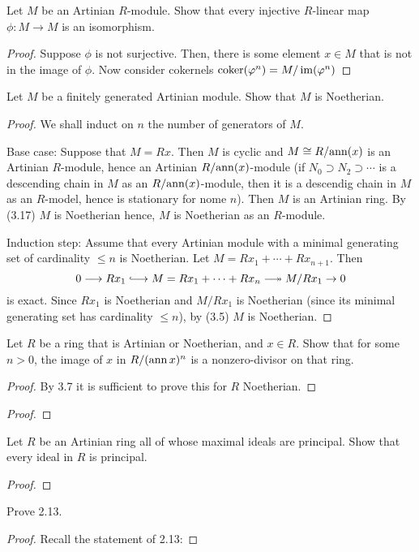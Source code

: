 \newpage
\begin{problem}
Let $M$ be an Artinian $R$-module. Show that every injective
$R$-linear map $\phi\colon M\to M$ is an isomorphism.
\end{problem}
\begin{proof}
Suppose $\phi$ is not surjective. Then, there is some element
$x\in M$ that is not in the image of $\phi$. Now consider
cokernels $\operatorname{coker}(\varphi^n)=M/\operatorname{im}(\varphi^n)$
\end{proof}
\newpage
\begin{problem}
Let $M$ be a finitely generated Artinian module. Show that $M$ is
Noetherian.
\end{problem}
\begin{proof}
We shall induct on $n$ the number of generators of $M$.

Base case: Suppose that $M=Rx$. Then $M$ is cyclic and $M\cong
R/{\operatorname{ann}(x)}$ is an Artinian $R$-module, hence an Artinian
$R/{\operatorname{ann}(x)}$-module (if $N_0\supset N_2\supset\cdots$ is a
descending chain in $M$ as an $R/{\operatorname{ann}(x)}$-module, then it is a
descendig chain in $M$ as an $R$-model, hence is stationary for
nome $n$). Then $M$ is an Artinian ring. By (3.17) $M$ is
Noetherian hence, $M$ is Noetherian as an $R$-module.

Induction step: Assume that every Artinian module with a minimal
generating set of cardinality $\leq n$ is Noetherian. Let
$M=Rx_1+\cdots+Rx_{n+1}$. Then
\[
0
\longrightarrow
Rx_1
\hooklongrightarrow
M=Rx_1+\cdots+Rx_n
\twoheadlongrightarrow
M/Rx_1
\rightarrow
0
\]
is exact. Since $Rx_1$ is Noetherian and $M/Rx_1$ is Noetherian
(since its minimal generating set has cardinality $\leq n$), by
(3.5)  $M$ is Noetherian.
\end{proof}
\newpage
\begin{problem}
Let $R$ be a ring that is Artinian or Noetherian, and $x\in
R$. Show that for some $n>0$, the image of $x$ in $R/(\operatorname{ann} x)^n$ is
a nonzero-divisor on that ring.
\end{problem}
\begin{proof}
By 3.7 it is sufficient to prove this for $R$ Noetherian.
\end{proof}
\newpage
\begin{problem}
\end{problem}
\begin{proof}
 
\end{proof}
\newpage
\begin{problem}
Let $R$ be an Artinian ring all of whose maximal ideals are
principal. Show that every ideal in $R$ is principal.
\end{problem}
\begin{proof}
\end{proof}
\newpage
\begin{problem}
Prove 2.13.
\end{problem}
\begin{proof}
Recall the statement of 2.13:
\end{proof}

